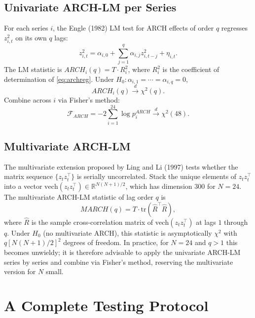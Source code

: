 \documentclass[12pt]{article}
\begin{document}
\subsection{Univariate ARCH-LM per Series}

For each series $i$, the Engle (1982) LM test for ARCH effects of order $q$ regresses
$z_{i,t}^2$ on its own $q$ lags:
\begin{equation}
    z_{i,t}^2 = \alpha_{i,0} + \sum_{j=1}^{q} \alpha_{i,j} z_{i,t-j}^2 + \eta_{i,t}.
    \label{eq:archreg}
\end{equation}
The LM statistic is $ARCH_i(q) = T \cdot R_i^2$, where $R_i^2$ is the coefficient of
determination of \eqref{eq:archreg}. Under $H_0: \alpha_{i,1} = \cdots = \alpha_{i,q} = 0$,
\begin{equation}
    ARCH_i(q) \overset{d}{\to} \chi^2(q).
\end{equation}
Combine across $i$ via Fisher's method:
\begin{equation}
    \mathcal{F}_{ARCH} = -2 \sum_{i=1}^{24} \log p_i^{ARCH}
    \overset{d}{\to} \chi^2(48).
\end{equation}

\subsection{Multivariate ARCH-LM}

The multivariate extension proposed by Ling and Li (1997) tests whether the matrix
sequence $\{z_t z_t^\top\}$ is serially uncorrelated. Stack the unique elements of
$z_t z_t^\top$ into a vector $\mathrm{vech}(z_t z_t^\top) \in \mathbb{R}^{N(N+1)/2}$,
which has dimension $300$ for $N = 24$. The multivariate ARCH-LM statistic of lag order
$q$ is
\begin{equation}
    MARCH(q) = T \cdot \mathrm{tr}\!\left(\hat{R}^\top \hat{R}\right),
\end{equation}
where $\hat{R}$ is the sample cross-correlation matrix of $\mathrm{vech}(z_t z_t^\top)$
at lags $1$ through $q$. Under $H_0$ (no multivariate ARCH), this statistic is
asymptotically $\chi^2$ with $q[N(N+1)/2]^2$ degrees of freedom. In practice, for
$N = 24$ and $q > 1$ this becomes unwieldy; it is therefore advisable to apply the
univariate ARCH-LM series by series and combine via Fisher's method, reserving the
multivariate version for $N$ small.

\section{A Complete Testing Protocol}
\end{document}

